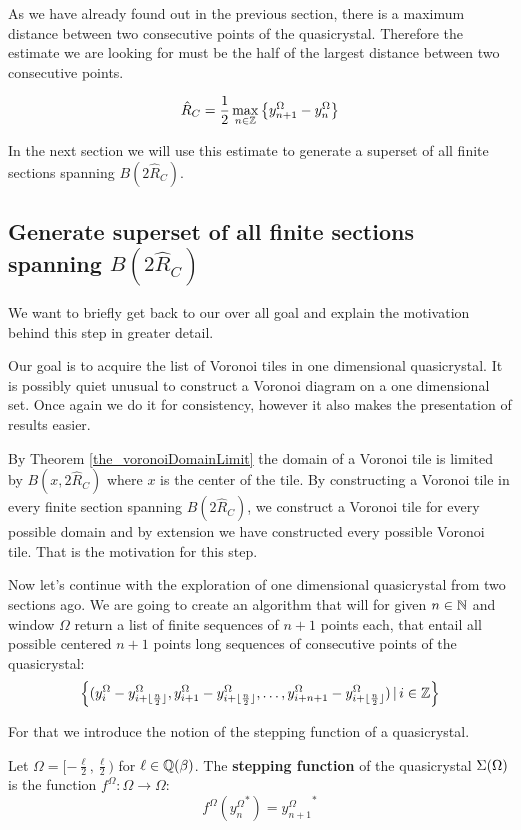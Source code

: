 \documentclass[text.tex]{subfiles}
\begin{document}
As we have already found out in the previous section, there is a maximum distance between two consecutive points of the quasicrystal. Therefore the estimate we are looking for must be the half of the largest distance between two consecutive points. 

$$\hat{R}_C = \frac{1}{2}\max_{n\in\mathbb{Z}}\big\{y^\Omega_{n+1}-y^\Omega_n\big\}$$

In the next section we will use this estimate to generate a superset of all finite sections spanning $B(2\hat{R}_C)$. 

\subsection{Generate superset of all finite sections spanning $B(2\hat{R}_C)$}
We want to briefly get back to our over all goal and explain the motivation behind this step in greater detail. 

Our goal is to acquire the list of Voronoi tiles in one dimensional quasicrystal. It is possibly quiet unusual to construct a Voronoi diagram on a one dimensional set. Once again we do it for consistency, however it also makes the presentation of results easier. 

By Theorem \ref{the_voronoiDomainLimit} the domain of a Voronoi tile is limited by $B(x, 2\hat{R}_C)$ where $x$ is the center of the tile. By constructing a Voronoi tile in every finite section spanning $B(2\hat{R}_C)$, we construct a Voronoi tile for every possible domain and by extension we have constructed every possible Voronoi tile. That is the motivation for this step. 

Now let's continue with the exploration of one dimensional quasicrystal from two sections ago. We are going to create an algorithm that will for given $n\in\mathbb{N}$ and window $\Omega$ return a list of finite sequences of $n+1$ points each, that entail all possible centered $n+1$ points long sequences of consecutive points of the quasicrystal: 
$$\left\{ (y^\Omega_{i}-y^\Omega_{i+\lfloor\frac{n}{2}\rfloor}, y^\Omega_{i+1}-y^\Omega_{i+\lfloor\frac{n}{2}\rfloor}, \dots, y^\Omega_{i+n+1}-y^\Omega_{i+\lfloor\frac{n}{2}\rfloor} )\,|\, i\in\mathbb{Z} \right\}$$

For that we introduce the notion of the stepping function of a quasicrystal. 

\begin{definition}
\label{def_steppingFunction}
Let $\Omega = [-\frac{\ell}{2},\frac{\ell}{2})$ for $\ell\in\mathbb{Q}(\beta)$. The \textbf{stepping function} of the quasicrystal $\Sigma(\Omega)$ is the function $f^\Omega: \Omega \to \Omega$: 
$$f^\Omega ({y^\Omega_{n}}^\ast) = {y^\Omega_{n+1}}^\ast$$ 
\end{definition}
\end{document}
